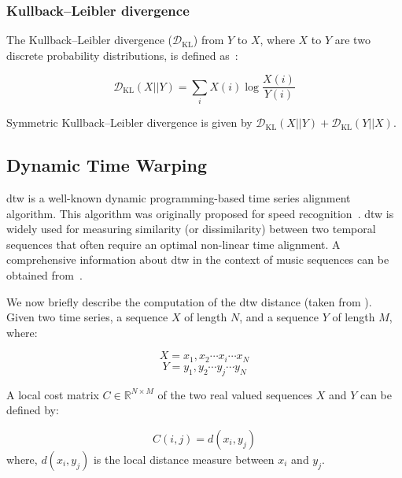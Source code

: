 \subsubsection{Kullback–Leibler divergence}
\label{sec:kl_divergence}

The Kullback–Leibler divergence ($\mathcal{D}_\mathrm{KL}$) from $Y$ to $X$, where $X$ to $Y$ are two discrete probability distributions,  is defined as~\citep{kullback1951information}:

\begin{equation}
\label{eq:kl_divergence}
\mathcal{D}_\mathrm{KL}(X||Y) = \sum_{i}X(i) \log \frac{X(i)}{Y(i)}
\end{equation}

Symmetric Kullback–Leibler divergence is given by $\mathcal{D}_\mathrm{KL}(X||Y) + \mathcal{D}_\mathrm{KL}(Y||X)$.


\subsection{Dynamic Time Warping}
\label{sec_DTW_distance_measure}

\Acrfull{dtw} is a well-known dynamic programming-based time series alignment algorithm. This algorithm was originally proposed for speed recognition~\citep{Sakoe78TASLP}. \Gls{dtw} is widely used for measuring similarity (or dissimilarity) between two temporal sequences that often require an optimal non-linear time alignment. A comprehensive information about \gls{dtw} in the context of music sequences can be obtained from~\cite{muller2007dynamic}. 

We now briefly describe the computation of the \gls{dtw} distance (taken from \cite{Keogh2004,muller2007dynamic}). Given two time series, a sequence  $X$ of length $N$, and a sequence $Y$ of length $M$, where:

\begin{equation}
	X = x_1, x_2 \cdots x_i \cdots x_N
\end{equation}
\begin{equation}
	Y = y_1, y_2 \cdots y_j \cdots y_N
\end{equation}

\noindent A local cost matrix $C \in \mathbb{R}^{N \times M}$ of the two real valued sequences $X$ and $Y$ can be defined by:

\begin{equation}
C(i,j) = d(x_i,y_j)
\end{equation}
\noindent where, $d(x_i,y_j)$ is the local distance measure between $x_i$ and $y_j$.

